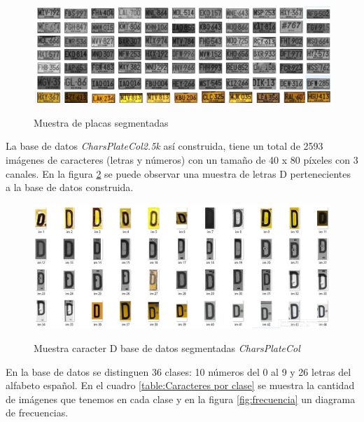 \begin{figure}[H]
  {\includegraphics[width=1\linewidth]{imagenes/RESULTADOS/PLACAS_PA_SEGMENTAR.jpg}}
   \caption{Muestra de placas segmentadas}
    \label{fig:Muestra de placas segmentadas}  
\end{figure}


La base de datos \textit{CharsPlateCol2.5k} así construida, tiene un total de 2593 imágenes de caracteres (letras y números) con un tamaño de 40 x 80 píxeles con 3 canales. En la figura \ref{fig:Muestra caracter D base de datos} se puede observar una muestra de letras D pertenecientes a la base de datos construida.

\begin{figure}[H]
  {\includegraphics[width=1\linewidth]{imagenes/RESULTADOS/muestra_letra.jpg}}
   \caption{Muestra caracter D base de datos segmentadas \textit{CharsPlateCol}}
    \label{fig:Muestra caracter D base de datos}
\end{figure} 

En la base de datos se distinguen 36 clases: 10 números del 0 al 9 y 26 letras del alfabeto español. En el cuadro \ref{table:Caracteres por clase} se muestra la cantidad de imágenes que tenemos en cada clase y en la figura \ref{fig:frecuencia} un diagrama de frecuencias. 

